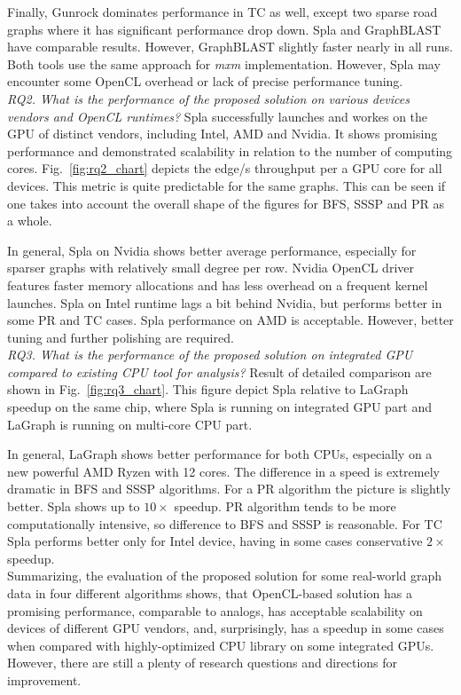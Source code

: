 Finally, Gunrock dominates performance in TC as well, except two sparse road graphs where it has significant performance drop down. Spla and GraphBLAST have comparable results. However, GraphBLAST slightly faster nearly in all runs. Both tools use the same approach for \textit{mxm} implementation. However, Spla may encounter some OpenCL overhead or lack of precise performance tuning.\\

\textit{RQ2. What is the performance of the proposed solution on various devices vendors and OpenCL runtimes?} Spla successfully launches and workes on the GPU of distinct vendors, including Intel, AMD and Nvidia. It shows promising performance and demonstrated scalability in relation to the number of computing cores. Fig.~\ref{fig:rq2_chart} depicts the edge/s throughput per a GPU core for all devices. This metric is quite predictable for the same graphs. This can be seen if one takes into account the overall shape of the figures for BFS, SSSP and PR as a whole.

In general, Spla on Nvidia shows better average performance, especially for sparser graphs with relatively small degree per row. Nvidia OpenCL driver features faster memory allocations and has less overhead on a frequent kernel launches. Spla on Intel runtime lags a bit behind Nvidia, but performs better in some PR and TC cases. Spla performance on AMD is acceptable. However, better tuning and further polishing are required.\\

\textit{RQ3. What is the performance of the proposed solution on integrated GPU compared to existing CPU tool for analysis?} Result of detailed comparison are shown in Fig.~\ref{fig:rq3_chart}. This figure depict Spla relative to LaGraph speedup on the same chip, where Spla is running on integrated GPU part and LaGraph is running on multi-core CPU part. 

In general, LaGraph shows better performance for both CPUs, especially on a new powerful AMD Ryzen with 12 cores. The difference in a speed is extremely dramatic in BFS and SSSP algorithms. For a PR algorithm the picture is slightly better. Spla shows up to $10\times$ speedup. PR algorithm tends to be more computationally intensive, so difference to BFS and SSSP is reasonable. For TC Spla performs better only for Intel device, having in some cases conservative $2\times$ speedup.\\

Summarizing, the evaluation of the proposed solution for some real-world graph data in four different algorithms shows, that OpenCL-based solution has a promising performance, comparable to analogs, has acceptable scalability on devices of different GPU vendors, and, surprisingly, has a speedup in some cases when compared with highly-optimized CPU library on some integrated GPUs. However, there are still a plenty of research questions and directions for improvement.

